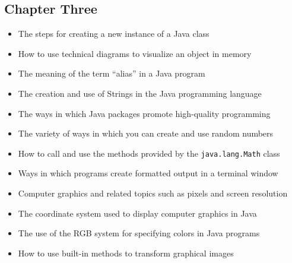 \documentclass[11pt]{article}
\begin{document}
\vspace*{-.2in}
\subsection*{Chapter Three}

\begin{itemize}

  \itemsep 0in

  \item The steps for creating a new instance of a Java class
  \item How to use technical diagrams to visualize an object in memory
  \item The meaning of the term ``alias'' in a Java program
  \item The creation and use of Strings in the Java programming language
  \item The ways in which Java packages promote high-quality programming
  \item The variety of ways in which you can create and use random numbers
  \item How to call and use the methods provided by the {\tt java.lang.Math} class
  \item Ways in which programs create formatted output in a terminal window
  \item Computer graphics and related topics such as pixels and screen resolution
  \item The coordinate system used to display computer graphics in Java
  \item The use of the RGB system for specifying colors in Java programs
  \item How to use built-in methods to transform graphical images


\end{itemize}
\end{document}
